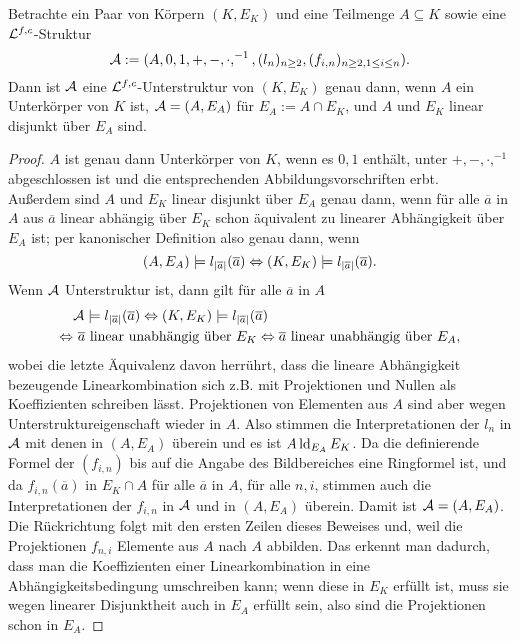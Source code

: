     \begin{lemma}
    	Betrachte ein Paar von Körpern $(K,E_K)$ und eine Teilmenge ${A\subseteq K}$ sowie eine $\mathcal{L}^{f,c}$-Struktur $$\mathcal{A}:=(A,0,1,+,-,\cdot,^{-1},(l_n)_{n\geq2},(f_{i,n})_{n\geq2,1\leq i\leq n}).$$ Dann ist $\mathcal{A}$ eine $\mathcal{L}^{f,c}$-Unterstruktur von $(K,E_K)$ genau dann, wenn $A$ ein Unterkörper von $K$ ist, $\mathcal{A}=(A,E_A)$ für $E_A:=A\cap E_K$, und $A$ und $E_K$ linear disjunkt über $E_A$ sind.
    \end{lemma}
    \begin{proof}
    	$A$ ist genau dann Unterkörper von $K$, wenn es $0,1$ enthält, unter $+,-,\cdot,^{-1}$ abgeschlossen ist und die entsprechenden Abbildungsvorschriften erbt.\\
    	Außerdem sind $A$ und $E_K$ linear disjunkt über $E_A$ genau dann, wenn für alle $\overline{a}$ in $A$ aus $\overline{a}$ linear abhängig über $E_K$ schon äquivalent zu linearer Abhängigkeit über $E_A$ ist; per kanonischer Definition also genau dann, wenn $$(A,E_A)\models l_{{\left| \overline{a} \right|}}(\overline{a}) \Leftrightarrow (K,E_K)\models l_{{\left| \overline{a} \right|}}(\overline{a}).$$
    	Wenn $\mathcal{A}$ Unterstruktur ist, dann gilt für alle $\overline{a}$ in $A$
    	\begin{align*}
    	&\mathcal{A}\models l_{{\left| \overline{a} \right|}}(\overline{a})\Leftrightarrow(K,E_K)\models l_{{\left| \overline{a} \right|}}(\overline{a})\\
    	\Leftrightarrow&\ \overline{a}\text{ linear unabhängig über }E_K\Leftrightarrow\overline{a}\text{ linear unabhängig über }E_A,
    	\end{align*}
    	wobei die letzte Äquivalenz davon herrührt, dass die lineare Abhängigkeit bezeugende Linearkombination sich z.B. mit Projektionen und Nullen als Koeffizienten schreiben lässt. Projektionen von Elementen aus $A$ sind aber wegen Unterstruktureigenschaft wieder in $A$.\newpage
    	Also stimmen die Interpretationen der $l_n$ in $\mathcal{A}$ mit denen in $(A,E_A)$ überein und es ist $A\operatorname{ld}_{E_A}E_K$. Da die definierende Formel der $(f_{i,n})$ bis auf die Angabe des Bildbereiches eine Ringformel ist, und da $f_{i,n}(\overline{a})$ in $E_K\cap A$ für alle $\overline{a}$ in $A$, für alle $n,i$, stimmen auch die Interpretationen der $f_{i,n}$ in $\mathcal{A}$ und in $(A,E_A)$ überein. Damit ist $\mathcal{A}=(A,E_A)$.\\
    	Die Rückrichtung folgt mit den ersten Zeilen dieses Beweises und, weil die Projektionen $f_{n,i}$ Elemente aus $A$ nach $A$ abbilden. Das erkennt man dadurch, dass man die Koeffizienten einer Linearkombination in eine Abhängigkeitsbedingung umschreiben kann; wenn diese in $E_K$ erfüllt ist, muss sie wegen linearer Disjunktheit auch in $E_A$ erfüllt sein, also sind die Projektionen schon in $E_A$.
    \end{proof}
    
